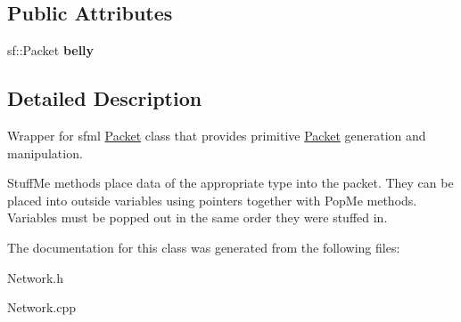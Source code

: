 \subsection*{Public Attributes}
\begin{DoxyCompactItemize}
\item 
\hypertarget{class_packet_acd7d675f2640238e3926d4489cf26e30}{}\label{class_packet_acd7d675f2640238e3926d4489cf26e30} 
sf\+::\+Packet {\bfseries belly}
\end{DoxyCompactItemize}


\subsection{Detailed Description}
Wrapper for sfml \hyperlink{class_packet}{Packet} class that provides primitive \hyperlink{class_packet}{Packet} generation and manipulation. 

Stuff\+Me methods place data of the appropriate type into the packet. They can be placed into outside variables using pointers together with Pop\+Me methods. Variables must be popped out in the same order they were stuffed in. 

The documentation for this class was generated from the following files\+:\begin{DoxyCompactItemize}
\item 
Network.\+h\item 
Network.\+cpp\end{DoxyCompactItemize}
